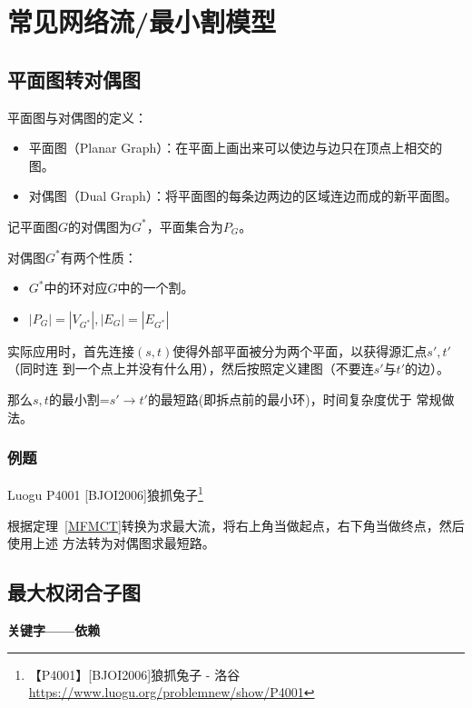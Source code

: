 \section{常见网络流/最小割模型}
\subsection{平面图转对偶图}

平面图与对偶图的定义：
\begin{itemize}
	\item 平面图（Planar Graph）：在平面上画出来可以使边与边只在顶点上相交的图。
	\item 对偶图（Dual Graph）：将平面图的每条边两边的区域连边而成的新平面图。
\end{itemize}

记平面图$G$的对偶图为$G^*$，平面集合为$P_G$。

对偶图$G^*$有两个性质：
\begin{itemize}
	\item
	      \begin{property}
		      $G^*$中的环对应$G$中的一个割。
	      \end{property}
	\item
	      \begin{property}
		      $|P_G|=|V_{G^*}|,|E_G|=|E_{G^*}|$
	      \end{property}
\end{itemize}

实际应用时，首先连接$(s,t)$使得外部平面被分为两个平面，以获得源汇点$s',t'$（同时连
到一个点上并没有什么用），然后按照定义建图（不要连$s'$与$t'$的边）。

那么$s,t$的最小割=$s'\rightarrow t'$的最短路(即拆点前的最小环)，时间复杂度优于
常规做法。

\subsubsection{例题}

Luogu P4001 [BJOI2006]狼抓兔子\footnote{【P4001】[BJOI2006]狼抓兔子 - 洛谷
\url{https://www.luogu.org/problemnew/show/P4001}}

根据定理~\ref{MFMCT}转换为求最大流，将右上角当做起点，右下角当做终点，然后使用上述
方法转为对偶图求最短路。



\subsection{最大权闭合子图}
{\bfseries 关键字——依赖}

